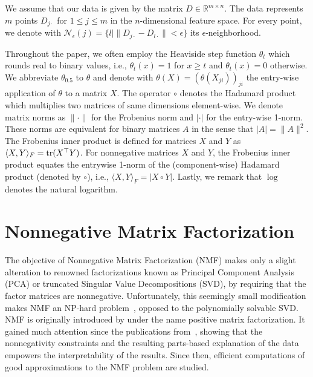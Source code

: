 We assume that our data is given by the matrix $D\in\mathbb{R}^{m\times n}$. The data represents $m$ points $D_{j\cdot}$ for $1\leq j\leq m$ in the $n$-dimensional feature space. For every point, we denote with $\mathcal{N}_\epsilon(j)=\{l| \|D_{j\cdot}-D_{l\cdot}\|<\epsilon\}$ its $\epsilon$-neighborhood.

Throughout the paper, we often employ the Heaviside step function $\theta_t$ which rounds real to binary values, i.e., $\theta_t(x)=1$ for $x\geq t$  and $\theta_t(x)=0$ otherwise. We abbreviate $\theta_{0.5}$ to $\theta$ and denote with $\theta(X)=(\theta(X_{ji}))_{ji}$ the entry-wise application of $\theta$ to a matrix $X$.
The operator $\circ$ denotes the Hadamard product which multiplies two matrices of same dimensions element-wise. 
We denote matrix norms as $\|\cdot\|$ for the Frobenius norm and $|\cdot|$ for the entry-wise 1-norm. These norms are equivalent for binary matrices $A$ in the sense that $|A|=\|A\|^2$. The Frobenius inner product is defined for matrices $X$ and $Y$ as $\langle X,Y\rangle_F=\operatorname*{tr}(X^\top Y)$. For nonnegative matrices $X$ and $Y$, the Frobenius inner product equates the entrywise 1-norm of the (component-wise) Hadamard product (denoted by $\circ$), i.e., $\langle X,Y\rangle_F=|X\circ Y|$. 
Lastly, we remark that $\log$ denotes the natural logarithm. 
\section{Nonnegative Matrix Factorization}
The objective of Nonnegative Matrix Factorization (NMF) makes only a slight alteration to renowned factorizations known as Principal Component Analysis (PCA) or truncated Singular Value Decompositions (SVD), by requiring that the factor matrices are nonnegative. Unfortunately, this seemingly small modification makes NMF an NP-hard problem~\citep{vavasis2009complexity}, opposed to the polynomially solvable SVD. NMF is originally introduced by \cite{paatero1994positive} under the name positive matrix factorization. It gained much attention since the publications from~\citeauthor{lee1999learning}, showing that the nonnegativity constraints and the resulting parts-based explanation of the data empowers the interpretability of the results. Since then, efficient computations of good approximations to the NMF problem are studied.            


